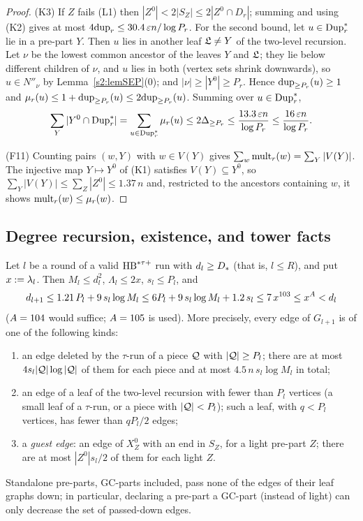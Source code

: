 \begin{proof}
(K3) If $Z$ fails (L1) then $|Z^0|<2|S_Z|\le2|Z^0\cap D_r|$; summing and using
(K2) gives at most $4\mathrm{dup}_r\le30.4\,\varepsilon n/\log P_r$. For the second bound, let
$u\in\mathrm{Dup}^{*}_r$ lie in a pre-part $Y$. Then $u$ lies in another leaf $\mathfrak{L}\ne Y$
of the two-level recursion. Let $\nu$ be the lowest common ancestor of the
leaves $Y$ and $\mathfrak{L}$; they lie below different children of $\nu$, and $u$
lies in both (vertex sets shrink downwards), so $u\in N''_\nu$ by
Lemma~\ref{s2:lemSEP}(0); and $|\nu|\ge|Y^0|\ge P_r$. Hence
$\mathrm{dup}_{\ge P_r}(u)\ge1$ and $\mu_r(u)\le1+\mathrm{dup}_{\ge P_r}(u)\le2\mathrm{dup}_{\ge
P_r}(u)$. Summing over $u\in\mathrm{Dup}^{*}_r$,
\[
\sum_Y|Y^0\cap\mathrm{Dup}^{*}_r|=\sum_{u\in\mathrm{Dup}^{*}_r}\mu_r(u)\le2\Delta_{\ge P_r}
\le\frac{13.3\,\varepsilon n}{\log P_r}\le\frac{16\,\varepsilon n}{\log P_r}.
\]

(F11) Counting pairs $(w,Y)$ with $w\in V(Y)$ gives
$\sum_w\mathrm{mult}_r(w)=\sum_Y|V(Y)|$. The injective map $Y\mapsto Y^0$ of (K1)
satisfies $V(Y)\subseteq Y^0$, so $\sum_Y|V(Y)|\le\sum_{Z}|Z^0|\le1.37\,n$ and,
restricted to the ancestors containing $w$, it shows $\mathrm{mult}_r(w)\le\mu_r(w)$.
\end{proof}

\subsection{Degree recursion, existence, and tower facts}

\begin{proposition}\label{s2:propDegRec}
Let $l$ be a round of a valid $\mathrm{HB}^{*\tau{+}}$ run with $d_l\ge D_{*}$ (that is,
$l\le R$), and put $x\mathrel{:=}\lambda_l$. Then $M_l\le d_l^2$, $\Lambda_l\le2x$,
$s_l\le P_l$, and
\[
d_{l+1}\le1.21\,P_l+9\,s_l\log M_l\le6P_l+9\,s_l\log M_l+1.2\,s_l\le
7\,x^{103}\le x^{A}<d_l
\]
($A=104$ would suffice; $A=105$ is used). More precisely, every edge of
$G_{l+1}$ is of one of the following kinds:
\begin{enumerate}
\item[(a)] an edge deleted by the $\tau$-run of a piece $\mathcal{Q}$ with
$|\mathcal{Q}|\ge P_l$; there are at most $4s_l|\mathcal{Q}|\log|\mathcal{Q}|$ of them for
each piece and at most $4.5\,n\,s_l\log M_l$ in total;
\item[(b)] an edge of a leaf of the two-level recursion with fewer than $P_l$
vertices (a small leaf of a $\tau$-run, or a piece with $|\mathcal{Q}|<P_l$); such a
leaf, with $q<P_l$ vertices, has fewer than $qP_l/2$ edges;
\item[(c)] a \emph{guest edge}: an edge of $X^0_Z$ with an end in $S_Z$, for a
light pre-part $Z$; there are at most $|Z^0|s_l/2$ of them for each light $Z$.
\end{enumerate}
Standalone pre-parts, GC-parts included, pass none of the edges of their leaf
graphs down; in particular, declaring a pre-part a GC-part (instead of light)
can only decrease the set of passed-down edges.
\deps{\ref{s2:lem14tau}, \ref{s2:lemCap}, \ref{s2:propOV}, \ref{s2:defHBtp}, \ref{s2:lemSEP}, \ref{s1:condG1}, \ref{s2:lemOVgeneric}}
\end{proposition}

